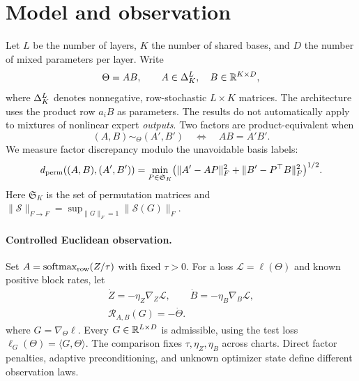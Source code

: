\section{Model and observation}
\label{sec:problem}

Let $L$ be the number of layers, $K$ the number of shared bases, and $D$
the number of mixed parameters per layer. Write
\begin{equation}
 \Theta=AB,\qquad A\in\Delta_K^L,\quad B\in\mathbb{R}^{K\times D},
 \label{eq:factorization}
\end{equation}
where $\Delta_K^L$ denotes nonnegative, row-stochastic $L\times K$
matrices. The architecture uses the product row $a_iB$ as parameters.
The results do not automatically apply to mixtures of nonlinear expert
\emph{outputs}. Two factors are product-equivalent when
\begin{equation}
 (A,B)\sim_\Theta(A',B')\quad\Longleftrightarrow\quad AB=A'B'.
 \label{eq:effective_equivalence}
\end{equation}
We measure factor discrepancy modulo the unavoidable basis labels:
\begin{equation}
 d_{\rm perm}((A,B),(A',B'))=
 \min_{P\in\mathfrak S_K}
 \bigl(\|A'-AP\|_F^2+\|B'-P^\top B\|_F^2\bigr)^{1/2}.
 \label{eq:permutation-distance}
\end{equation}
Here $\mathfrak S_K$ is the set of permutation matrices and
$\|\mathcal S\|_{F\to F}=\sup_{\|G\|_F=1}\|\mathcal S(G)\|_F$.

\paragraph{Controlled Euclidean observation.}
Set $A=\operatorname{softmax}_{\rm row}(Z/\tau)$ with fixed $\tau>0$.
For a loss $\mathcal L=\ell(\Theta)$ and known positive block rates, let
\begin{align}
 \dot Z=-\eta_Z\nabla_Z\mathcal L,\qquad
 \dot B=-\eta_B\nabla_B\mathcal L,
 \label{eq:response_flow}\\
 \mathcal R_{A,B}(G)=-\dot\Theta.
 \label{eq:response_operator}
\end{align}
where $G=\nabla_\Theta\ell$. Every $G\in\mathbb{R}^{L\times D}$ is admissible,
using the test loss $\ell_G(\Theta)=\langle G,\Theta\rangle$.
The comparison fixes $\tau,\eta_Z,\eta_B$ across charts. Direct factor
penalties, adaptive preconditioning, and unknown optimizer state define
different observation laws.

